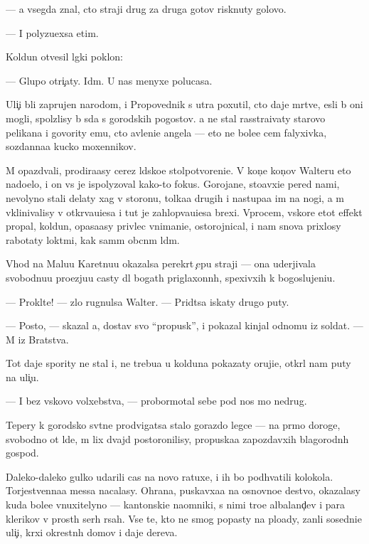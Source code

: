 \documentclass[10pt]{book}
\begin{document}
— {\Y}a vsegda znal, cto straji drug za druga gotov{\yi} risknuty go\-lo\-vo{\y}.

— I polyzu{\y}exsa etim.

Koldun otvesil l{\e}gki{\y} poklon:

— Glupo otri{\c}aty. Id{\e}m. U nas menyxe polucasa.

Uli{\c}i b{\yi}li zaprujen{\yi} narodom, i Pro\-po\-ved\-nik s utra poxutil, cto daje m{\e}rtv{\yi}{\y}e, {\y}esli b{\yi} oni mogli, spolzlisy b{\yi} s{\io}da s gorodskih pogostov. {\Y}a ne stal rasstra{\y}ivaty starovo pelikana i govority {\y}emu, cto {\y}avleni{\y}e angela — eto ne bole{\y}e cem falyxivka, sozdanna{\y}a kucko{\y} moxennikov.

M{\yi} opazd{\yi}vali, prodira{\y}asy cerez l{\io}dsko{\y}e stolpotvoreni{\y}e. V kon{\c}e kon{\c}ov Walteru eto nado{\y}elo, i on vs{\e} je ispolyzoval kako{\y}-to fokus. Gorojane, sto{\y}avxi{\y}e pered nami, nevolyno stali delaty xag v storonu, tolka{\y}a drugih i nastupa{\y}a im na nogi, a m{\yi} vklinivalisy v otkr{\yi}va{\y}u{\x}i{\y}esa i tut je zahlop{\yi}va{\y}u{\x}i{\y}esa brexi. Vprocem, vskore etot effekt propal, koldun, opasa{\y}asy privlec vnimani{\y}e, ostorojnical, i nam snova pri\-xlosy rabotaty lokt{\ia}mi, kak sam{\yi}m ob{\yi}cn{\yi}m l{\io}d{\ia}m.

V{\yi}hod na Malu{\y}u Karetnu{\y}u okazalsa perekr{\yi}t {\c}ep{\y}u straji — ona uderjivala svobodnu{\y}u pro{\y}ezju{\y}u casty dl{\ia} bogat{\yi}h priglaxonn{\yi}h, spexivxih k bogoslujeni{\y}u.

— Prokl{\ia}t{\y}e! — zlo rugnulsa Walter. — Prid{\e}tsa iskaty drugo{\y} puty.

— Posto{\y}, — skazal {\y}a, dostav svo{\y} ``propusk'', i pokazal kinjal odnomu iz soldat. — M{\yi} iz Bratstva.

Tot daje spority ne stal i, ne trebu{\y}a u kolduna pokazaty oruji{\y}e, otkr{\yi}l nam puty na uli{\c}u.

— I bez vs{\ia}kovo volxebstva, — probormotal sebe pod nos mo{\y} nedrug.

Tepery k gorodsko{\y} sv{\ia}t{\yi}ne prodvigatsa stalo gorazdo legce — na pr{\ia}mo{\y} do\-ro\-ge, svobodno{\y} ot l{\io}de{\y}, m{\yi} lix dvajd{\yi} postoronilisy, propuska{\y}a zapozdavxih blago\-rod\-n{\yi}h gospod.

Daleko-daleko gulko udarili cas{\yi} na novo{\y} ratuxe, i ih bo{\y} podhvatili kolokola. Torjestvenna{\y}a messa nacalasy. Ohrana, puskavxa{\y}a na osnovno{\y}e de{\y}stvo, okazalasy kuda bole{\y}e vnuxitelyno{\y} — kantonski{\y}e na{\y}omniki, s nimi tro{\y}e albaland{\c}ev i para klerikov v prost{\yi}h ser{\yi}h r{\ia}sah. Vse te, kto ne smog popasty na plo{\x}ady, zan{\ia}li sosedni{\y}e uli{\c}i, kr{\yi}xi okrestn{\yi}h domov i daje derev{\y}a.
\end{document}
